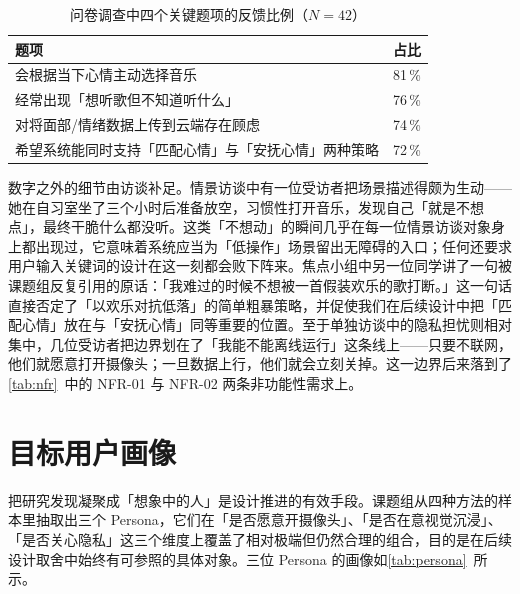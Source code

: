 \begin{table}[!htb]
  \centering
  \caption{问卷调查中四个关键题项的反馈比例（$N=42$）}\label{tab:survey}
  \begin{tabular*}{\linewidth}{@{\extracolsep{\fill}}lc}
    \toprule
    \textbf{题项} & \textbf{占比} \\
    \midrule
    会根据当下心情主动选择音乐 & 81\,\% \\
    经常出现「想听歌但不知道听什么」 & 76\,\% \\
    对将面部/情绪数据上传到云端存在顾虑 & 74\,\% \\
    希望系统能同时支持「匹配心情」与「安抚心情」两种策略 & 72\,\% \\
    \bottomrule
  \end{tabular*}
\end{table}

数字之外的细节由访谈补足。情景访谈中有一位受访者把场景描述得颇为生动——她在自习室坐了三个小时后准备放空，习惯性打开音乐，发现自己「就是不想点」，最终干脆什么都没听。这类「不想动」的瞬间几乎在每一位情景访谈对象身上都出现过，它意味着系统应当为「低操作」场景留出无障碍的入口；任何还要求用户输入关键词的设计在这一刻都会败下阵来。焦点小组中另一位同学讲了一句被课题组反复引用的原话：「我难过的时候不想被一首假装欢乐的歌打断。」这一句话直接否定了「以欢乐对抗低落」的简单粗暴策略，并促使我们在后续设计中把「匹配心情」放在与「安抚心情」同等重要的位置。至于单独访谈中的隐私担忧则相对集中，几位受访者把边界划在了「我能不能离线运行」这条线上——只要不联网，他们就愿意打开摄像头；一旦数据上行，他们就会立刻关掉。这一边界后来落到了\cref{tab:nfr}~中的 NFR-01 与 NFR-02 两条非功能性需求上。

\section{目标用户画像}

把研究发现凝聚成「想象中的人」是设计推进的有效手段。课题组从四种方法的样本里抽取出三个 Persona，它们在「是否愿意开摄像头」、「是否在意视觉沉浸」、「是否关心隐私」这三个维度上覆盖了相对极端但仍然合理的组合，目的是在后续设计取舍中始终有可参照的具体对象。三位 Persona 的画像如\cref{tab:persona}~所示。

